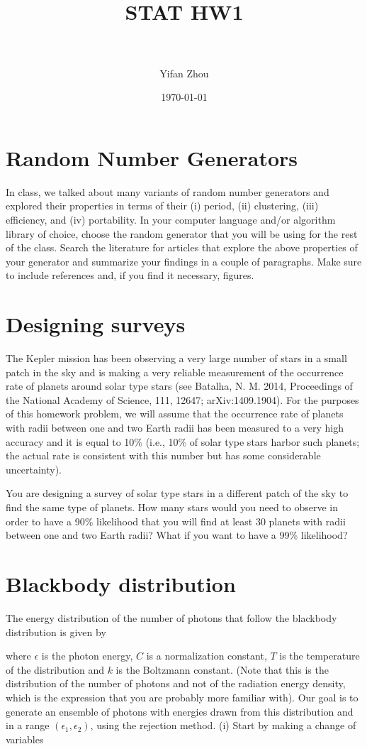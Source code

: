\documentclass[paper=letter, fontsize=11pt]{scrartcl} %
\title{ 
  \normalfont \normalsize 
  \textsc{} \\ [25pt] %
  \horrule{0.5pt} \\ [0.4cm] %
  \huge STAT HW1 \\ %
  \horrule{2pt} \\ [0.5cm] %
}
\author{Yifan Zhou} %
\date{\normalsize\today} %
\numberwithin{equation}{section} %
\numberwithin{figure}{section} %
\numberwithin{table}{section} %
\begin{document}
\maketitle %
\section{Random Number Generators}
In class, we talked about many variants of random number generators
and explored their properties in terms of their (i) period, (ii)
clustering, (iii) efficiency, and (iv) portability. In your computer
language and/or algorithm library of choice, choose the random
generator that you will be using for the rest of the class. Search the
literature for articles that explore the above properties of your
generator and summarize your findings in a couple of paragraphs. Make
sure to include references and, if you find it necessary, figures.

\section{Designing surveys}
The Kepler mission has been observing a very large number of stars in
a small patch in the sky and is making a very reliable measurement of
the occurrence rate of planets around solar type stars (see Batalha,
N. M. 2014, Proceedings of the National Academy of Science, 111,
12647; arXiv:1409.1904). For the purposes of this homework problem, we
will assume that the occurrence rate of planets with radii between one
and two Earth radii has been measured to a very high accuracy and it
is equal to 10\% (i.e., 10\% of solar type stars harbor such planets;
the actual rate is consistent with this number but has some
considerable uncertainty).

You are designing a survey of solar type stars in a
different patch of the sky to find the same type of planets. How
many stars would you need to observe in order to have a 90\%
likelihood that you will find at least 30 planets with radii
between one and two Earth radii? What if you want to have a 99\%
likelihood?


\section{Blackbody distribution}
\newcommand{\epsi}{\ensuremath{\epsilon}}
\newcommand{\dd}{\ensuremath{\mathrm{d}}}
The energy distribution of the number of photons that follow the
blackbody distribution is given by

where $\epsi$ is the photon energy, $C$ is a normalization constant, $T$ is the
temperature of the distribution and $k$ is the Boltzmann constant. (Note
that this is the distribution of the number of photons and not of the
radiation energy density, which is the expression that you are
probably more familiar with). Our goal is to generate an ensemble of
photons with energies drawn from this distribution and in a range
$(\epsi_{1}, \epsi_{2})$, using the rejection method. (i) Start by making a change of
variables
\end{document}

